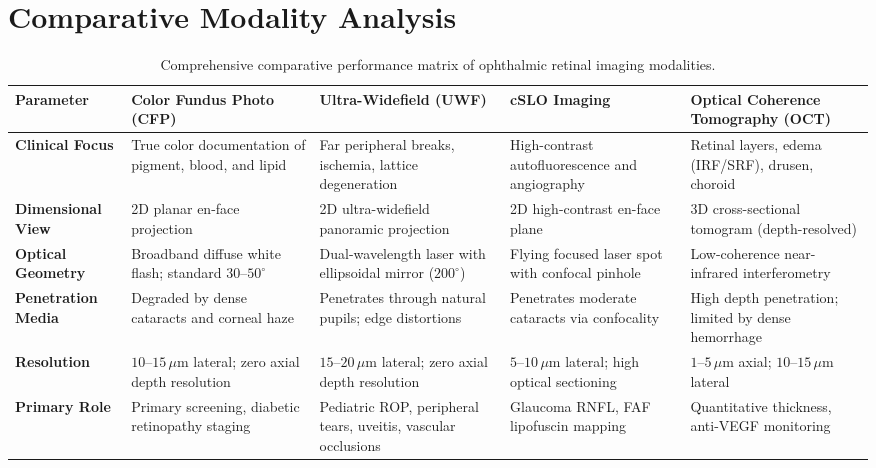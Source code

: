 \documentclass[11pt,a4paper]{article}
\begin{document}
\section{Comparative Modality Analysis}

\begin{table}[htbp]
\centering
\small
\setlength{\tabcolsep}{3pt}
\begin{tabular}{p{2.6cm}p{2.8cm}p{2.9cm}p{2.8cm}p{2.9cm}}
\toprule
\textbf{Parameter} & \textbf{Color Fundus Photo (CFP)} & \textbf{Ultra-Widefield (UWF)} & \textbf{cSLO Imaging} & \textbf{Optical Coherence Tomography (OCT)} \\
\midrule
\textbf{Clinical Focus} & True color documentation of pigment, blood, and lipid & Far peripheral breaks, ischemia, lattice degeneration & High-contrast autofluorescence and angiography & Retinal layers, edema (IRF/SRF), drusen, choroid \\
\addlinespace
\textbf{Dimensional View} & 2D planar en-face projection & 2D ultra-widefield panoramic projection & 2D high-contrast en-face plane & 3D cross-sectional tomogram (depth-resolved) \\
\addlinespace
\textbf{Optical Geometry} & Broadband diffuse white flash; standard $30\text{--}50^\circ$ & Dual-wavelength laser with ellipsoidal mirror ($200^\circ$) & Flying focused laser spot with confocal pinhole & Low-coherence near-infrared interferometry \\
\addlinespace
\textbf{Penetration Media} & Degraded by dense cataracts and corneal haze & Penetrates through natural pupils; edge distortions & Penetrates moderate cataracts via confocality & High depth penetration; limited by dense hemorrhage \\
\addlinespace
\textbf{Resolution} & $10\text{--}15\,\mu\text{m}$ lateral; zero axial depth resolution & $15\text{--}20\,\mu\text{m}$ lateral; zero axial depth resolution & $5\text{--}10\,\mu\text{m}$ lateral; high optical sectioning & $1\text{--}5\,\mu\text{m}$ axial; $10\text{--}15\,\mu\text{m}$ lateral \\
\addlinespace
\textbf{Primary Role} & Primary screening, diabetic retinopathy staging & Pediatric ROP, peripheral tears, uveitis, vascular occlusions & Glaucoma RNFL, FAF lipofuscin mapping & Quantitative thickness, anti-VEGF monitoring \\
\bottomrule
\end{tabular}
\caption{Comprehensive comparative performance matrix of ophthalmic retinal imaging modalities.}
\label{tab:modality_comparison}
\end{table}
\end{document}
